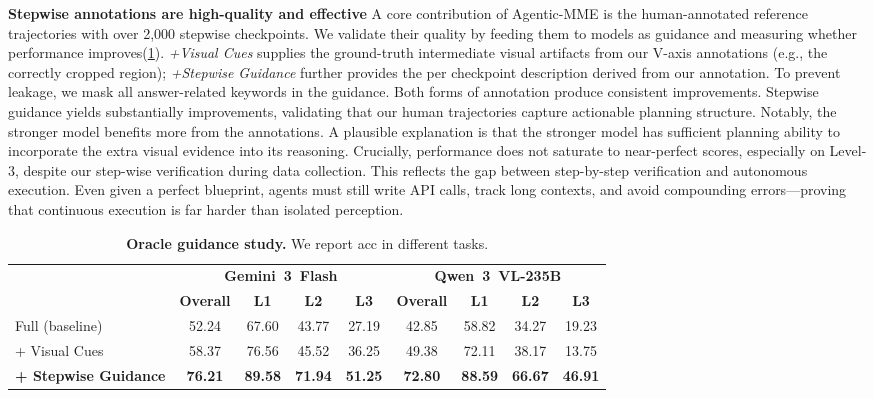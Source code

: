 \documentclass[runningheads]{llncs}
\theoremstyle{plain}
\theoremstyle{definition}
\theoremstyle{remark}
\begin{document}
\vspace{1mm}
\noindent\textbf{Stepwise annotations are high-quality and effective}
A core contribution of Agentic-MME is the human-annotated reference
trajectories with over 2,000 stepwise checkpoints.
We validate their quality by feeding them to models as guidance and measuring whether performance improves(\cref{tab:oracle_guidance}).
\textit{+Visual Cues} supplies the ground-truth intermediate visual
artifacts from our V-axis annotations (e.g., the correctly cropped
region); \textit{+Stepwise Guidance} further provides the per checkpoint description derived from our annotation. To prevent leakage, we mask all answer-related keywords in the guidance.
Both forms of annotation produce consistent improvements.
Stepwise guidance yields substantially improvements, validating that our human trajectories capture actionable planning structure. Notably, the stronger model benefits more from the annotations. A plausible explanation is that the stronger model has sufficient planning ability to incorporate the extra visual evidence into its reasoning. Crucially, performance does not saturate to near-perfect scores, especially on Level-3, despite our step-wise verification during data collection. This reflects the gap between step-by-step verification and autonomous execution. Even given a perfect blueprint, agents must still write API calls, track long contexts, and avoid compounding errors—proving that continuous execution is far harder than isolated perception.
\begin{table}[t]
\centering
\caption{\textbf{Oracle guidance study.} We report acc in different tasks.}
\vspace{-3mm}
\label{tab:oracle_guidance}
\scriptsize
\setlength{\tabcolsep}{4.0pt}
\renewcommand{\arraystretch}{1.1}

\setlength{\aboverulesep}{0pt}
\setlength{\belowrulesep}{0pt}

\begin{tabular}{l cccc cccc} 
\toprule
\rowcolor{CadetBlue!20}
& \multicolumn{4}{c}{\textbf{Gemini~3~Flash}} & \multicolumn{4}{c}{\textbf{Qwen~3~VL-235B}} \\
\cmidrule(lr){2-5}\cmidrule(lr){6-9}
\rowcolor{CadetBlue!20}
\multirow{-2}{*}{\textbf{Setting}} & \textbf{Overall} & \textbf{L1} & \textbf{L2} & \textbf{L3} & \textbf{Overall} & \textbf{L1} & \textbf{L2} & \textbf{L3} \\
\midrule
Full (baseline)
  & 52.24 & 67.60 & 43.77 & 27.19
  & 42.85 & 58.82 & 34.27 & 19.23 \\
+ Visual Cues
  & 58.37 & 76.56 & 45.52 & 36.25
  & 49.38 & 72.11 & 38.17 & 13.75 \\
\rowcolor{customblue!20} %
\textbf{+ Stepwise Guidance}
  & \textbf{76.21} & \textbf{89.58} & \textbf{71.94} & \textbf{51.25}
  & \textbf{72.80} & \textbf{88.59} & \textbf{66.67} & \textbf{46.91} \\
\bottomrule
\end{tabular}
\vspace{-4mm}
\end{table}
\end{document}
